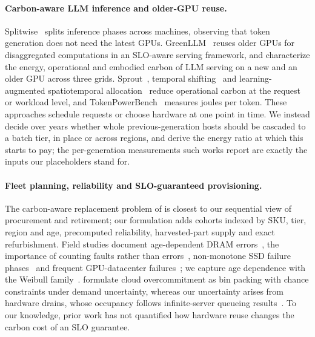 \documentclass{article} %
\begin{document}
\paragraph{Carbon-aware LLM inference and older-GPU reuse.}
Splitwise~\citep{Patel2023SplitwiseEfficient} splits inference phases across machines, observing that token generation does not need the latest GPUs. GreenLLM~\citep{Shi2024GreenllmDisaggregating} reuses older GPUs for disaggregated computations in an SLO-aware serving framework, and \citet{Nguyen2024TowardsSustainable} characterize the energy, operational and embodied carbon of LLM serving on a new and an older GPU across three grids. Sprout~\citep{Li2024SproutGreen}, temporal shifting~\citep{Wiesner2021LetsWait} and learning-augmented spatiotemporal allocation~\citep{Lechowicz2025LearningaugmentedCompetitive} reduce operational carbon at the request or workload level, and TokenPowerBench~\citep{Niu2026TokenpowerbenchBenchmarking} measures joules per token. These approaches schedule requests or choose hardware at one point in time. We instead decide over years whether whole previous-generation hosts should be cascaded to a batch tier, in place or across regions, and derive the energy ratio at which this starts to pay; the per-generation measurements such works report are exactly the inputs our placeholders stand for.

\paragraph{Fleet planning, reliability and SLO-guaranteed provisioning.}
The carbon-aware replacement problem of \citet{Sharma2025TowardOptimal} is closest to our sequential view of procurement and retirement; our formulation adds cohorts indexed by SKU, tier, region and age, precomputed reliability, harvested-part supply and exact refurbishment. Field studies document age-dependent DRAM errors~\citep{Schroeder2009DramErrors}, the importance of counting faults rather than errors~\citep{Sridharan2015MemoryErrors}, non-monotone SSD failure phases~\citep{Meza2015LargescaleFlash} and frequent GPU-datacenter failures~\citep{Hu2024CharacterizationLarge}; we capture age dependence with the Weibull family~\citep{Weibull1951StatisticalDistribution}. \citet{Cohen2017OvercommitmentCloud} formulate cloud overcommitment as bin packing with chance constraints under demand uncertainty, whereas our uncertainty arises from hardware drains, whose occupancy follows infinite-server queueing results~\citep{Eick1993PhysicsMtg}. To our knowledge, prior work has not quantified how hardware reuse changes the carbon cost of an SLO guarantee.
\end{document}
